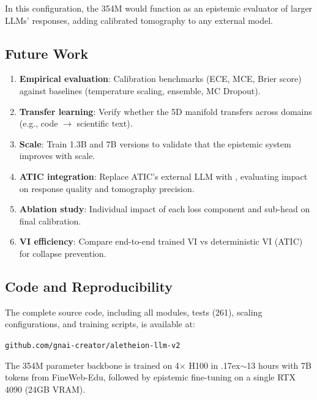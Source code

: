 In this configuration, the 354M \aletheion{} would function as an
epistemic evaluator of larger LLMs' responses, adding calibrated
tomography to any external model.

\subsection{Future Work}

\begin{enumerate}
    \item \textbf{Empirical evaluation}: Calibration benchmarks (ECE,
    MCE, Brier score) against baselines (temperature scaling, ensemble,
    MC Dropout).

    \item \textbf{Transfer learning}: Verify whether the 5D manifold
    transfers across domains (e.g., code $\to$ scientific text).

    \item \textbf{Scale}: Train 1.3B and 7B versions to validate that
    the epistemic system improves with scale.

    \item \textbf{ATIC integration}: Replace ATIC's external LLM with
    \aletheion{}, evaluating impact on response quality and tomography
    precision.

    \item \textbf{Ablation study}: Individual impact of each loss
    component and sub-head on final calibration.

    \item \textbf{VI efficiency}: Compare end-to-end trained VI vs
    deterministic VI (ATIC) for collapse prevention.
\end{enumerate}

\subsection{Code and Reproducibility}

The complete source code, including all modules, tests (261), scaling
configurations, and training scripts, is available at:

\begin{center}
    \texttt{github.com/gnai-creator/aletheion-llm-v2}
\end{center}

The 354M parameter backbone is trained on 4$\times$ H100 in
{\raise.17ex\hbox{$\scriptstyle\sim$}}13 hours with 7B tokens from FineWeb-Edu,
followed by epistemic fine-tuning on a single RTX 4090 (24GB VRAM).
